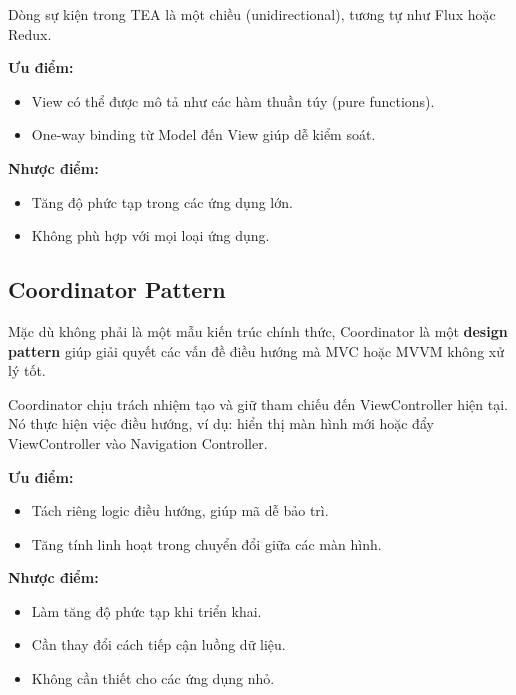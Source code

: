     Dòng sự kiện trong TEA là một chiều (unidirectional), tương tự như Flux hoặc Redux.
    
    \textbf{Ưu điểm:}
    \begin{itemize}
      \item View có thể được mô tả như các hàm thuần túy (pure functions).
      \item One-way binding từ Model đến View giúp dễ kiểm soát.
    \end{itemize}
    
    \textbf{Nhược điểm:}
    \begin{itemize}
      \item Tăng độ phức tạp trong các ứng dụng lớn.
      \item Không phù hợp với mọi loại ứng dụng.
    \end{itemize}
    
    \subsection{Coordinator Pattern}
    
    Mặc dù không phải là một mẫu kiến trúc chính thức, Coordinator là một \textbf{design pattern} giúp giải quyết các vấn đề điều hướng mà MVC hoặc MVVM không xử lý tốt.
    
    Coordinator chịu trách nhiệm tạo và giữ tham chiếu đến ViewController hiện tại. Nó thực hiện việc điều hướng, ví dụ: hiển thị màn hình mới hoặc đẩy ViewController vào Navigation Controller.
    
    \textbf{Ưu điểm:}
    \begin{itemize}
      \item Tách riêng logic điều hướng, giúp mã dễ bảo trì.
      \item Tăng tính linh hoạt trong chuyển đổi giữa các màn hình.
    \end{itemize}
    
    \textbf{Nhược điểm:}
    \begin{itemize}
      \item Làm tăng độ phức tạp khi triển khai.
      \item Cần thay đổi cách tiếp cận luồng dữ liệu.
      \item Không cần thiết cho các ứng dụng nhỏ.
    \end{itemize}
    